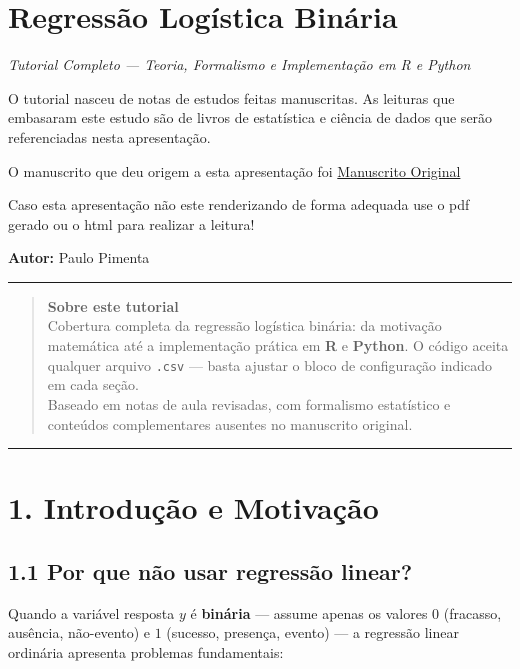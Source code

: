 \documentclass[
  letterpaper,
  DIV=11,
  numbers=noendperiod]{scrartcl}
\author{}
\date{}
\begin{document}
\section{Regressão Logística
Binária}\label{regressuxe3o-loguxedstica-binuxe1ria}

\emph{Tutorial Completo --- Teoria, Formalismo e Implementação em R e
Python}

O tutorial nasceu de notas de estudos feitas manuscritas. As leituras
que embasaram este estudo são de livros de estatística e ciência de
dados que serão referenciadas nesta apresentação.

O manuscrito que deu origem a esta apresentação foi
\href{analise_de_regressao_logistica_versao_1.pdf}{Manuscrito Original}

Caso esta apresentação não este renderizando de forma adequada use o pdf
gerado ou o html para realizar a leitura!

\textbf{Autor:} Paulo Pimenta

\begin{center}\rule{0.5\linewidth}{0.5pt}\end{center}

\begin{quote}
\textbf{Sobre este tutorial}\\
Cobertura completa da regressão logística binária: da motivação
matemática até a implementação prática em \textbf{R} e \textbf{Python}.
O código aceita qualquer arquivo \texttt{.csv} --- basta ajustar o bloco
de configuração indicado em cada seção.\\
Baseado em notas de aula revisadas, com formalismo estatístico e
conteúdos complementares ausentes no manuscrito original.
\end{quote}

\begin{center}\rule{0.5\linewidth}{0.5pt}\end{center}

\section{1. Introdução e
Motivação}\label{introduuxe7uxe3o-e-motivauxe7uxe3o}

\subsection{1.1 Por que não usar regressão
linear?}\label{por-que-nuxe3o-usar-regressuxe3o-linear}

Quando a variável resposta \(y\) é \textbf{binária} --- assume apenas os
valores \(0\) (fracasso, ausência, não-evento) e \(1\) (sucesso,
presença, evento) --- a regressão linear ordinária apresenta problemas
fundamentais:
\end{document}
